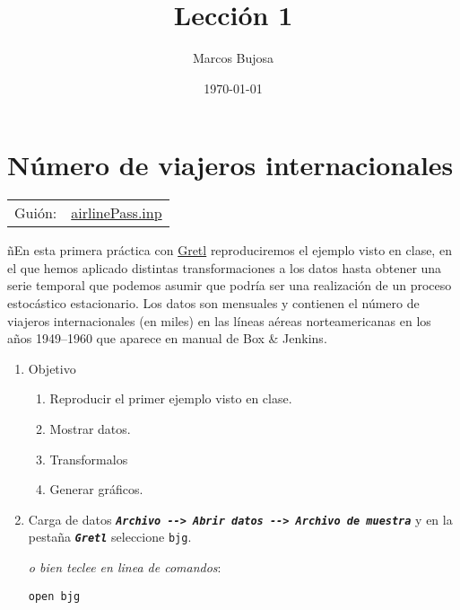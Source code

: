 \documentclass[11pt]{article}
\author{Marcos Bujosa}
\date{\today}
\title{Lección 1}
\begin{document}
\maketitle
\tableofcontents



\section{Número de viajeros internacionales}
\label{sec:orgc576d58}
\begin{center}
\begin{tabular}{ll}
Guión: & \href{https://github.com/mbujosab/EconometriaAplicada-SRC/blob/main/Practicas/PracticasGretl/pub/scripts/airlinePass.inp}{airlinePass.inp}\\[0pt]
\end{tabular}
\end{center}

ñEn esta primera práctica con \href{https://gretl.sourceforge.net/es.html}{Gretl} reproduciremos el ejemplo visto en
clase, en el que hemos aplicado distintas transformaciones a los datos
hasta obtener una serie temporal que podemos asumir que podría ser una
realización de un proceso estocástico estacionario.  Los datos son
mensuales y contienen el número de viajeros internacionales (en miles)
en las líneas aéreas norteamericanas en los años 1949--1960 que
aparece en manual de Box \& Jenkins.

\begin{enumerate}
\item Objetivo
\label{sec:org3e89c52}
\begin{enumerate}
\item Reproducir el primer ejemplo visto en clase.
\item Mostrar datos.
\item Transformalos
\item Generar gráficos.
\end{enumerate}

\item Carga de datos
\label{sec:orgcc64e77}
\textbf{\emph{\texttt{Archivo -{}-{}> Abrir datos -{}-{}> Archivo de muestra}}} y en la pestaña
\textbf{\emph{\texttt{Gretl}}} seleccione \texttt{bjg}.

{\vspace{0pt} \footnotesize \color{gray!70!black}
\emph{o bien teclee en linea de comandos}:
\begin{verbatim}
open bjg
\end{verbatim}
}
\end{enumerate}
\end{document}
